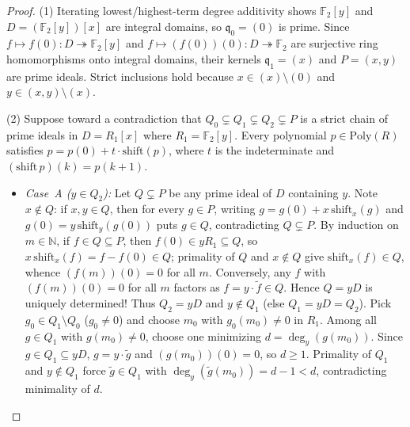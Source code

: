 \documentclass[11pt]{article}
\theoremstyle{definition}
\newcommand{\FF}{\mathbb{F}}
\newcommand{\NN}{\mathbb{N}}
\begin{document}
\begin{proof}
(1) Iterating lowest/highest-term degree additivity shows $\FF_2[y]$ and
$D = (\FF_2[y])[x]$ are integral domains, so $\mathfrak{q}_0 = (0)$ is prime. Since
$f \mapsto f(0) : D \twoheadrightarrow \FF_2[y]$ and
$f \mapsto (f(0))(0) : D \twoheadrightarrow \FF_2$ are surjective ring homomorphisms onto
integral domains, their kernels $\mathfrak{q}_1 = (x)$ and $P = (x, y)$ are prime ideals.
Strict inclusions hold because $x \in (x) \setminus (0)$ and $y \in (x, y) \setminus (x)$.

(2) Suppose toward a contradiction that $Q_0 \subsetneq Q_1 \subsetneq Q_2 \subsetneq P$
is a strict chain of prime ideals in $D = R_1[x]$ where $R_1 = \FF_2[y]$. Every polynomial
$p \in \mathrm{Poly}(R)$ satisfies $p = p(0) + t \cdot \mathrm{shift}(p)$, where $t$ is
the indeterminate and $(\mathrm{shift}\,p)(k) = p(k+1)$.
\begin{itemize}
  \item \emph{Case~A ($y \in Q_2$):} Let $Q \subsetneq P$ be any prime ideal of $D$
  containing $y$. Note $x \notin Q$: if $x, y \in Q$, then for every $g \in P$, writing
  $g = g(0) + x\,\mathrm{shift}_x(g)$ and $g(0) = y\,\mathrm{shift}_y(g(0))$ puts
  $g \in Q$, contradicting $Q \subsetneq P$. By induction on $m \in \NN$, if $f \in Q \subseteq P$,
  then $f(0) \in y R_1 \subseteq Q$, so $x\,\mathrm{shift}_x(f) = f - f(0) \in Q$;
  primality of $Q$ and $x \notin Q$ give $\mathrm{shift}_x(f) \in Q$, whence
  $(f(m))(0) = 0$ for all $m$. Conversely, any $f$ with $(f(m))(0) = 0$ for all $m$
  factors as $f = y \cdot \tilde{f} \in Q$. Hence $Q = y D$ is uniquely determined! Thus
  $Q_2 = y D$ and $y \notin Q_1$ (else $Q_1 = y D = Q_2$). Pick $g_0 \in Q_1 \setminus Q_0$
  ($g_0 \neq 0$) and choose $m_0$ with $g_0(m_0) \neq 0$ in $R_1$. Among all $g \in Q_1$
  with $g(m_0) \neq 0$, choose one minimizing $d = \deg_y(g(m_0))$. Since
  $g \in Q_1 \subseteq y D$, $g = y \cdot \tilde{g}$ and $(g(m_0))(0) = 0$, so $d \ge 1$.
  Primality of $Q_1$ and $y \notin Q_1$ force $\tilde{g} \in Q_1$ with
  $\deg_y(\tilde{g}(m_0)) = d - 1 < d$, contradicting minimality of $d$.


\end{itemize}
\end{proof}
\end{document}
